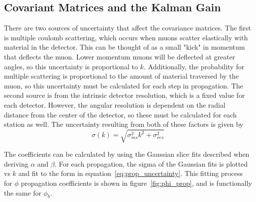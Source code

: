 \subsection{Covariant Matrices and the Kalman Gain} \label{sec:kbmtf_cov}
There are two sources of uncertainty that affect the covariance matrices. The first is multiple coulomb scattering, which occurs when muons scatter elastically with material in the detector. This can be thought of as a small "kick" in momentum that deflects the muon. Lower momentum muons will be deflected at greater angles, so this uncertainty is proportional to $k$. Additionally, the probability for multiple scattering is proportional to the amount of material traversed by the muon, so this uncertainty must be calculated for each step in propagation. The second source is from the intrinsic detector resolution, which is a fixed value for each detector. However, the angular resolution is dependent on the radial distance from the center of the detector, so these must be calculated for each station as well. The uncertainty resulting from both of these factors is given by
\begin{equation}
	\label{eq:prop_uncertainty}
	\sigma(k)=\sqrt{\sigma_{ms}^2k^2+\sigma_{res}^2}
\end{equation}

The coefficients can be calculated by using the Gaussian slice fits described when deriving $\alpha$ and $\beta$. For each propagation, the sigma of the Gaussian fits is plotted vs $k$ and fit to the form in equation~\ref{eq:prop_uncertainty}. This fitting process for $\phi$ propagation coefficients is shown in figure~\ref{fig:phi_prop}, and is functionally the same for $\phi_b$.

